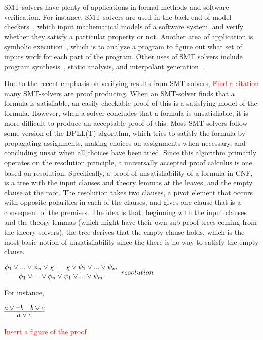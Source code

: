 \documentclass{article}
\begin{document}
	SMT solvers have plenty of applications in formal methods 
	and software verification. For instance, SMT solvers are used 
	in the back-end of model checkers~\cite{DBLP:books/daglib/0020348}, 
	which input mathematical 
	models of a software system, and verify whether they 
	satisfy a particular property or not. Another area of 
	application is symbolic
	execution~\cite{DBLP:journals/csur/BaldoniCDDF18}, 
	which is to analyze a 
	program to figure out what set of inputs work for each 
	part of the program. Other uses of SMT solvers include 
	program synthesis~\cite{synth}, static analysis, 
	and interpolant generation~\cite{DBLP:journals/corr/abs-1111-5652}.
	
	Due to the recent emphasis on verifying results from SMT-solvers,
	\textcolor{red}{Find a citation}
	many SMT-solvers are proof producing. When an SMT-solver finds 
	that a formula is satisfiable, an easily checkable proof of this is 
	a satisfying model of the formula. However, when a solver 
	concludes that a formula is unsatisfiable, it is more difficult 
	to produce an acceptable proof of this. Most SMT-solvers 
	follow some version of the DPLL(T) algorithm, which tries
	to satisfy the formula by propagating assignments, making 
	choices on assignments when necessary, and concluding unsat
	when all choices have been tried. Since this algorithm 
	primarily operates on the resolution principle, 
	a universally accepted proof calculus is one based 
	on resolution. Specifically, a proof of unsatisfiability 
	of a formula in CNF, is a tree with the input 
	clauses and theory lemmas at the leaves, and the empty 
	clause at the root. The resolution takes two clauses, 
	a pivot element that occurs with opposite polarities 
	in each of the clauses, and gives one clause that is 
	a consequent of the premises. The idea is that, beginning 
	with the input clauses and the theory lemmas (which might 
	have their own sub-proof trees coming from the theory solvers), 
	the tree derives that the empty clause holds, which is the 
	most basic notion of unsatisfiability since the there 
	is no way to satisfy the empty clause.
	
	\begin{center}
		$\infer[resolution]{\phi_1 \lor ... \lor \phi_n \lor 
			\psi_1 \lor ... \lor \psi_m}
		{\phi_1 \lor ... \lor \phi_n \lor \chi & \neg \chi 
			\lor \psi_1 \lor ... \lor \psi_m}$ 
	\end{center}
	For instance,
	\begin{center}
		$\infer{a \lor c}{a \lor \neg b & b \lor c}$
	\end{center}
	\textcolor{red}{Insert a figure of the proof}
	
\end{document}
